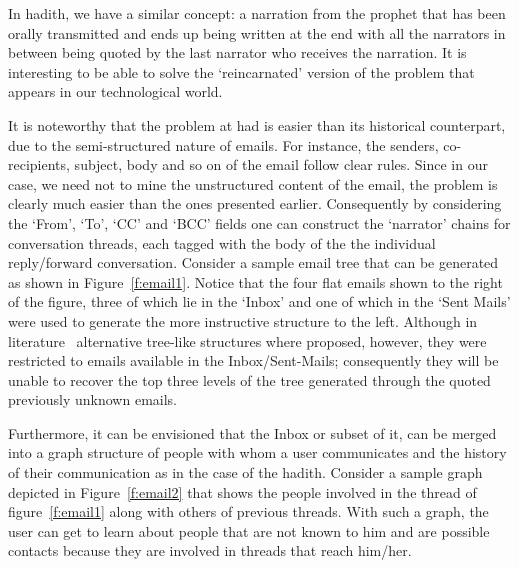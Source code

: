 \documentclass{llncs}
\begin{document}
In hadith, we have a similar concept: a narration from the prophet that has been orally transmitted and ends up being written
at the end with all the narrators in between being quoted by the last narrator who receives the narration. 
It is interesting to be able to solve the `reincarnated' version of
the problem that appears in our technological world.

It is noteworthy that the problem at had is easier than its historical counterpart, due to the semi-structured nature of emails.
For instance, the senders, co-recipients, subject, body and so on of the email follow clear rules. Since in our case, we need not 
to mine the unstructured content of the email, the problem is clearly much easier than the ones presented earlier. 
Consequently by considering the `From', `To', `CC' and `BCC' fields one can construct the `narrator' chains for conversation
threads, each tagged with the body of the the individual reply/forward conversation. Consider a sample email tree that
can be generated as shown in Figure~\ref{f:email1}. Notice that the four flat emails shown to the right of the figure,
three of which lie in the `Inbox' and one of which in the `Sent Mails' were used to generate the more instructive structure
to the left. Although in literature~\cite{Smith:00,Venolia:03} 
alternative tree-like structures where proposed, however, they were restricted to emails
available in the Inbox/Sent-Mails; consequently they will be unable to recover the top three levels of the tree generated through 
the quoted previously unknown emails. %

Furthermore, it can be envisioned that the Inbox or subset of it, can be merged into a graph structure of people with 
whom a user communicates and the
history of their communication as in the case of the hadith. 
Consider a sample graph depicted in Figure~\ref{f:email2} 
that shows the people involved in the thread of figure~\ref{f:email1} along with others of previous threads.
With such a graph, the user can get to learn about people that are not known to him and are possible contacts because they are involved 
in threads that reach him/her.

\end{document}
